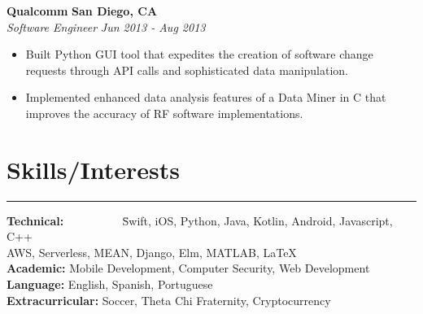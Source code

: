 \documentclass{res}
\begin{document}
\begin{resume}
\begin{itemize}
\end{itemize}

{\bf Qualcomm} \hfill {\bf San Diego, CA} \\
{\textit {Software Engineer}} \hfill {\textit {Jun 2013 - Aug 2013}} 
\begin{itemize} 
\renewcommand{\labelitemi}{\ding{117}}
\itemsep -2pt  
\item Built Python GUI tool that expedites the creation of software 
	change requests through API calls and sophisticated data manipulation.
\item Implemented enhanced data analysis features of a Data Miner in C that
	 improves the accuracy of RF software implementations.
\end{itemize}


\vspace{-9pt}

\section{{\large Skills/Interests}}

\vspace{-10pt}

\noindent\rule{\resumewidth}{0.4pt}  
\vspace{-30pt}
\begin{tabbing}
{\bf Technical: } ~~~~~~~~~ \= Swift, iOS, Python, Java, Kotlin, Android, Javascript, C++ \\
\> AWS, Serverless, MEAN, Django, Elm, MATLAB, \LaTeX \\
{\bf Academic: } \>  Mobile Development, Computer Security, Web Development \\
{\bf Language: } \> English, Spanish, Portuguese\\
{\bf Extracurricular: } \> Soccer, Theta Chi Fraternity, Cryptocurrency \\
\end{tabbing}

\end{resume} 
\end{document}
